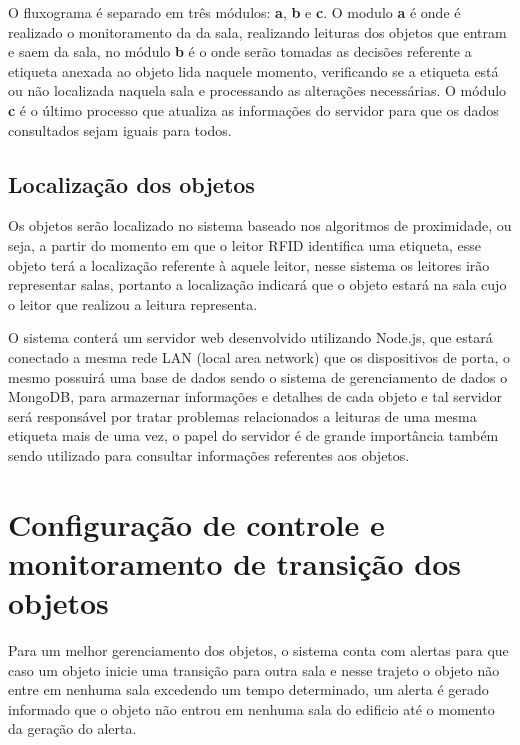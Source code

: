 \par
O fluxograma é separado em três módulos: \textbf{a}, \textbf{b} e \textbf{c}. O modulo \textbf{a} é onde é realizado o 
monitoramento da da sala, realizando leituras dos objetos que entram e saem da sala, no módulo \textbf{b} é o onde serão 
tomadas as decisões referente a etiqueta anexada ao objeto lida naquele momento, verificando se a etiqueta está ou não 
localizada naquela sala e processando as alterações necessárias. O módulo \textbf{c} é o último processo que atualiza as 
informações do servidor para que os dados consultados sejam iguais para todos.


\subsection{Localização dos objetos}

Os objetos serão localizado no sistema baseado nos algoritmos de proximidade, ou seja, a partir do momento em que o leitor 
RFID identifica uma etiqueta, esse objeto terá a localização referente à aquele leitor, nesse sistema os leitores irão representar 
salas, portanto a localização indicará que o objeto estará na sala cujo o leitor que realizou a leitura representa.

\par{}
O sistema conterá um servidor web desenvolvido utilizando Node.js, que estará conectado a mesma rede LAN (local area network) que os dispositivos de porta, o mesmo possuirá uma base de dados sendo o sistema de gerenciamento de dados o MongoDB, para armazernar informações e detalhes de cada objeto e tal servidor será responsável por tratar problemas relacionados a leituras de uma mesma etiqueta mais de uma vez, 
o papel do servidor é de grande importância também sendo utilizado para consultar informações referentes aos objetos.


\section{Configuração de controle e monitoramento de transição dos objetos}

Para um melhor gerenciamento dos objetos, o sistema conta com alertas para que caso um objeto inicie uma transição 
para outra sala e nesse trajeto o objeto não entre em nenhuma sala excedendo um tempo determinado, um alerta é gerado 
informado que o objeto não entrou em nenhuma sala do edificio até o momento da geração do alerta.

